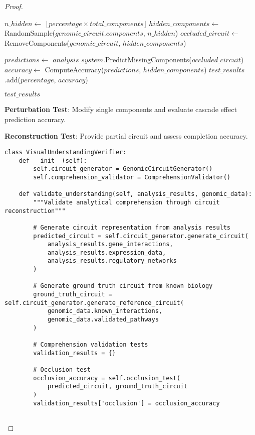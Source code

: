 \documentclass[12pt,a4paper]{article}
\begin{document}
\begin{proof}
\begin{algorithm}
\begin{algorithmic}
        \State $n\_hidden \gets$ $\lfloor percentage \times total\_components \rfloor$
        \State $hidden\_components \gets$ RandomSample($genomic\_circuit.components$, $n\_hidden$)
        \State $occluded\_circuit \gets$ RemoveComponents($genomic\_circuit$, $hidden\_components$)
        
        \State $predictions \gets$ $analysis\_system$.PredictMissingComponents($occluded\_circuit$)
        \State $accuracy \gets$ ComputeAccuracy($predictions$, $hidden\_components$)
        \State $test\_results$.add($percentage$, $accuracy$)
    \EndFor
    
    \State \Return $test\_results$
\EndProcedure
\end{algorithmic}
\end{algorithm}

\textbf{Perturbation Test}: Modify single components and evaluate cascade effect prediction accuracy.

\textbf{Reconstruction Test}: Provide partial circuit and assess completion accuracy.

\begin{lstlisting}[style=pythonstyle, caption=Visual Understanding Verification Implementation]
class VisualUnderstandingVerifier:
    def __init__(self):
        self.circuit_generator = GenomicCircuitGenerator()
        self.comprehension_validator = ComprehensionValidator()
        
    def validate_understanding(self, analysis_results, genomic_data):
        """Validate analytical comprehension through circuit reconstruction"""
        
        # Generate circuit representation from analysis results
        predicted_circuit = self.circuit_generator.generate_circuit(
            analysis_results.gene_interactions,
            analysis_results.expression_data,
            analysis_results.regulatory_networks
        )
        
        # Generate ground truth circuit from known biology
        ground_truth_circuit = self.circuit_generator.generate_reference_circuit(
            genomic_data.known_interactions,
            genomic_data.validated_pathways
        )
        
        # Comprehension validation tests
        validation_results = {}
        
        # Occlusion test
        occlusion_accuracy = self.occlusion_test(
            predicted_circuit, ground_truth_circuit
        )
        validation_results['occlusion'] = occlusion_accuracy
        

\end{lstlisting}
\end{proof}
\end{document}
